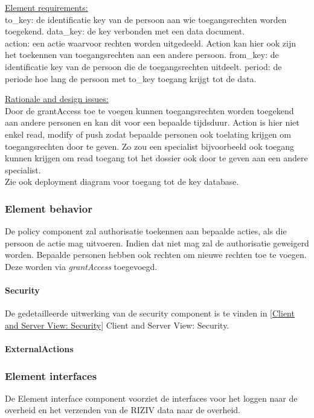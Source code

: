\documentclass[a4paper,10pt]{article}
\begin{document}
\underline{Element requirements:}\\
to\_key: de identificatie key van de persoon aan wie toegangsrechten worden toegekend.
data\_key: de key verbonden met een data document.\\
action: een actie waarvoor rechten worden uitgedeeld.  Action kan hier ook zijn het toekennen van toegangsrechten aan een andere persoon.
from\_key: de identificatie key van de persoon die de toegangsrechten uitdeelt.
period: de periode hoe lang de persoon met to\_key toegang krijgt tot de data.

\underline{Rationale and design issues:}\\
Door de grantAccess toe te voegen kunnen toegangsrechten worden toegekend aan andere personen en kan dit voor een bepaalde tijdsduur.  Action is hier niet enkel read, modify of push zodat bepaalde personen ook toelating krijgen om toegangsrechten door te geven.  Zo zou een specialist bijvoorbeeld ook toegang kunnen krijgen om read toegang tot het dossier ook door te geven aan een andere specialist.\\
Zie ook deployment diagram voor toegang tot de key database.

\subsubsection{Element behavior}
De policy component zal authorisatie toekennen aan bepaalde acties, als die persoon de actie mag uitvoeren.  Indien dat niet mag zal de authorisatie geweigerd worden.  Bepaalde personen hebben ook rechten om nieuwe rechten toe te voegen.  Deze worden via \textit{grantAccess} toegevoegd.

\paragraph{Security}
De gedetailleerde uitwerking van de security component is te vinden in \ref{Client and Server View: Security} Client and Server View: Security.

\paragraph{ExternalActions}

\subsubsection{Element interfaces} 
De Element interface component voorziet de interfaces voor het loggen naar de overheid en het verzenden van de RIZIV data naar de overheid.
\end{document}
